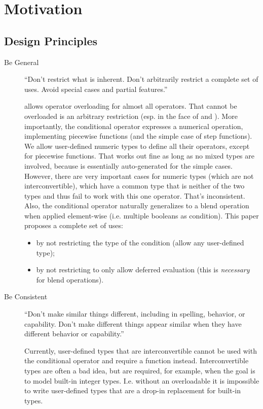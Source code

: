 \section{Motivation}
\subsection{Design Principles}
\begin{description}
  \item[Be General] “Don’t restrict what is inherent.
    Don’t arbitrarily restrict a complete set of uses.
    Avoid special cases and partial features.” \cite{P0745R0}

    \CC{} allows operator overloading for almost all operators.
    That  cannot be overloaded is an arbitrary restriction (esp. in the face of  and ).
    More importantly, the conditional operator expresses a numerical operation, implementing piecewise functions (and the simple case of step functions).
    We allow user-defined numeric types to define all their operators, except for piecewise functions.
    That works out fine as long as no mixed types are involved, because  is essentially auto-generated for the simple cases.
    However, there are very important cases for numeric types (which are not interconvertible), which have a common type that is neither of the two types and thus fail to work with this one operator.
    That's inconsistent.
    Also, the conditional operator naturally generalizes to a blend operation when applied element-wise (i.e. multiple booleans as condition).
    This paper proposes a complete set of uses:
    \begin{itemize}
      \item by not restricting the type of the condition (allow any user-defined type);
      \item by not restricting to only allow deferred evaluation (this is \emph{necessary} for blend operations).
    \end{itemize}

  \item[Be Consistent] “Don’t make similar things different, including in spelling, behavior, or capability.
    Don’t make different things appear similar when they have different behavior or capability.”

    Currently, user-defined types that are interconvertible cannot be used with the conditional operator and require a function instead.
    Interconvertible types are often a bad idea, but are required, for example, when the goal is to model built-in integer types.
    I.e. without an overloadable  it is impossible to write user-defined types that are a drop-in replacement for built-in types.


\end{description}
